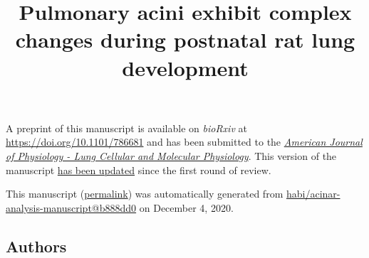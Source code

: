 \documentclass[
  american,
]{article}
\title{Pulmonary acini exhibit complex changes during postnatal rat lung development}
\author{}
\date{}
\begin{document}
\maketitle

A preprint of this manuscript is available on \emph{bioRxiv} at \url{https://doi.org/10.1101/786681} and has been submitted to the \href{https://journals.physiology.org/journal/ajplung}{\emph{American Journal of Physiology - Lung Cellular and Molecular Physiology}}.
This version of the manuscript \href{https://github.com/habi/acinar-analysis-manuscript/compare/d6fc17bd66bdca5cbff30d53e1dbc02d5351609b...b888dd09a43ba4c9cab06a58ba4001ff2b0c5b04}{has been updated} since the first round of review.

This manuscript
(\href{https://habi.github.io/acinar-analysis-manuscript/v/b888dd09a43ba4c9cab06a58ba4001ff2b0c5b04/}{permalink})
was automatically generated
from \href{https://github.com/habi/acinar-analysis-manuscript/tree/b888dd09a43ba4c9cab06a58ba4001ff2b0c5b04}{habi/acinar-analysis-manuscript@b888dd0}
on December 4, 2020.

\hypertarget{authors}{%
\subsection{Authors}\label{authors}}
\end{document}
